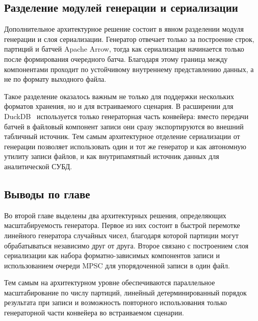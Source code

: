 \subsection{Разделение модулей генерации и сериализации}

Дополнительное архитектурное решение состоит в явном разделении модуля
генерации и слоя сериализации. Генератор отвечает только за построение строк,
партиций и батчей Apache Arrow, тогда как сериализация начинается
только после формирования очередного батча. Благодаря этому граница между
компонентами проходит по устойчивому внутреннему представлению данных, а не по
формату выходного файла.

Такое разделение оказалось важным не только для поддержки нескольких форматов
хранения, но и для встраиваемого сценария. В расширении для
DuckDB~\cite{schengen-duckdb-repo,duckdb-extensions} используется
только генераторная часть конвейера: вместо передачи батчей в файловый
компонент записи они сразу экспортируются во внешний табличный источник. Тем
самым архитектурное отделение сериализации от генерации позволяет использовать
один и тот же генератор и как автономную утилиту записи файлов, и как
внутрипамятный источник данных для аналитической СУБД.

\subsection*{Выводы по главе}

Во второй главе выделены два архитектурных решения, определяющих
масштабируемость генератора. Первое из них состоит в быстрой перемотке
линейного генератора случайных чисел, благодаря которой партиции могут
обрабатываться независимо друг от друга. Второе связано с построением слоя
сериализации как набора форматно-зависимых компонентов записи и
использованием очереди MPSC для упорядоченной записи в один файл.

Тем самым на архитектурном уровне обеспечиваются параллельное масштабирование
по числу партиций, линейный детерминированный порядок результата при записи и
возможность повторного использования только генераторной части конвейера во
встраиваемом сценарии.
